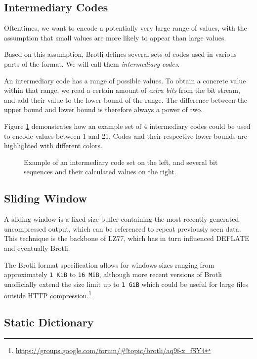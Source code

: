 \documentclass[english,master,dept460,male,cpp,cpdeclaration]{diploma}
\newcommand{\texfigure}[1]{
}
\begin{document}
	\subsection{Intermediary Codes}
	
	Oftentimes, we want to encode a potentially very large range of values, with the assumption that small values are more likely to appear than large values.
	
	Based on this assumption, Brotli defines several sets of codes used in various parts of the format. We will call them \emph{intermediary codes}.
	
	An intermediary code has a range of possible values. To obtain a concrete value within that range, we read a certain amount of \emph{extra bits} from the bit stream, and add their value to the lower bound of the range. The difference between the upper bound and lower bound is therefore always a power of two.
	
	Figure \ref{fig:intermediary-code-example} demonstrates how an example set of 4 intermediary codes could be used to encode values between 1 and 21. Codes and their respective lower bounds are highlighted with different colors.
	
	\begin{figure}[H]
		\centering
		\smallskip
		\texfigure{intermediary-code-example}
		\caption{Example of an intermediary code set on the left, and several bit sequences and their calculated values on the right.}
		\label{fig:intermediary-code-example}
	\end{figure}

	\subsection{Sliding Window}
	
	A sliding window is a fixed-size buffer containing the most recently generated uncompressed output, which can be referenced to repeat previously seen data. This technique is the backbone of LZ77\cite{LZ77}, which has in turn influenced DEFLATE and eventually Brotli.
	
	The Brotli format specification allows for windows sizes ranging from approximately \verb|1 KiB| to \verb|16 MiB|, although more recent versions of Brotli unofficially extend the size limit up to \verb|1 GiB| which could be useful for large files outside HTTP compression.\footnote{\url{https://groups.google.com/forum/\#!topic/brotli/aq9f-x\_fSY4}}
	
	\subsection{Static Dictionary}
	
\end{document}
